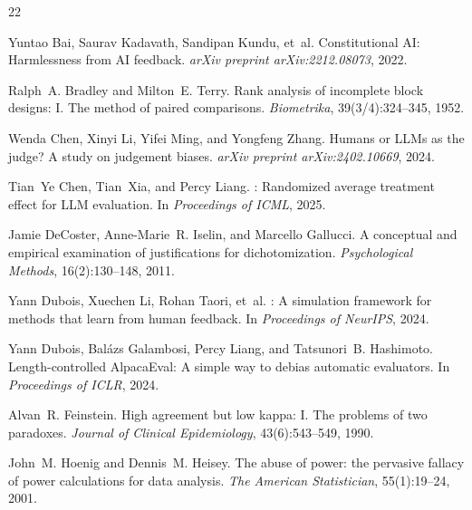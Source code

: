 \documentclass[11pt,a4paper]{article}
\begin{document}



\begin{thebibliography}{22}

Yuntao Bai, Saurav Kadavath, Sandipan Kundu, et~al.
\newblock Constitutional AI: Harmlessness from AI feedback.
\newblock \emph{arXiv preprint arXiv:2212.08073}, 2022.

Ralph~A. Bradley and Milton~E. Terry.
\newblock Rank analysis of incomplete block designs: {I}. {T}he method of paired comparisons.
\newblock \emph{Biometrika}, 39(3/4):324--345, 1952.

Wenda Chen, Xinyi Li, Yifei Ming, and Yongfeng Zhang.
\newblock Humans or LLMs as the judge? {A} study on judgement biases.
\newblock \emph{arXiv preprint arXiv:2402.10669}, 2024.

Tian~Ye Chen, Tian~Xia, and Percy Liang.
: Randomized average treatment effect for LLM evaluation.
\newblock In \emph{Proceedings of ICML}, 2025.

Jamie DeCoster, Anne-Marie~R. Iselin, and Marcello Gallucci.
\newblock A conceptual and empirical examination of justifications for dichotomization.
\newblock \emph{Psychological Methods}, 16(2):130--148, 2011.

Yann Dubois, Xuechen Li, Rohan Taori, et~al.
: A simulation framework for methods that learn from human feedback.
\newblock In \emph{Proceedings of NeurIPS}, 2024.

Yann Dubois, Bal\'{a}zs Galambosi, Percy Liang, and Tatsunori~B. Hashimoto.
\newblock Length-controlled {AlpacaEval}: A simple way to debias automatic evaluators.
\newblock In \emph{Proceedings of ICLR}, 2024.

Alvan~R. Feinstein.
\newblock High agreement but low kappa: {I}. {T}he problems of two paradoxes.
\newblock \emph{Journal of Clinical Epidemiology}, 43(6):543--549, 1990.

John~M. Hoenig and Dennis~M. Heisey.
\newblock The abuse of power: the pervasive fallacy of power calculations for data analysis.
\newblock \emph{The American Statistician}, 55(1):19--24, 2001.


\end{thebibliography}
\end{document}
